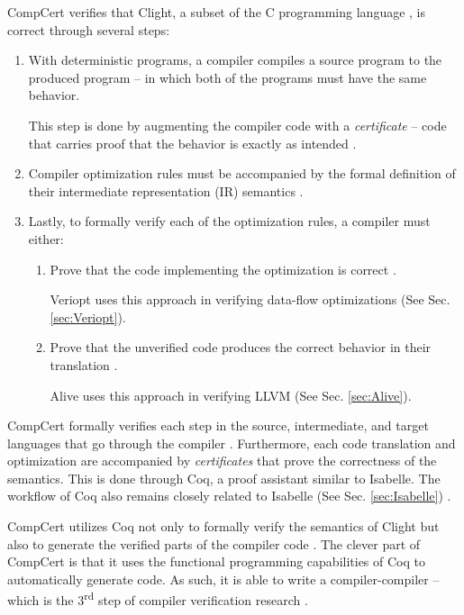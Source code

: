 CompCert verifies that Clight, a subset of the C programming language \cite{compcertVerification}, is correct through several steps:
\begin{enumerate}
    \item With deterministic programs, a compiler compiles a source program to the produced program -- in which both of the programs must have 
          the same behavior.
    
    This step is done by augmenting the compiler code with a \emph{certificate} -- code that carries proof that the behavior is exactly as intended 
    \cite[Sec. 2.2]{compcertVerification}.

    \item Compiler optimization rules must be accompanied by the formal definition of their intermediate representation (IR) semantics 
          \cite{compcertVerification,ATVA21_GraalVM_IR_Semantics}.
    
    \item Lastly, to formally verify each of the optimization rules, a compiler must either:
    \begin{enumerate}
        \item Prove that the code implementing the optimization is correct \cite[Sec. 2.4]{compcertVerification}.
        
        Veriopt uses this approach in verifying data-flow optimizations (See Sec. \ref{sec:Veriopt}).

        \item Prove that the unverified code produces the correct behavior in their translation \cite[Sec. 2.4]{compcertVerification}.

        Alive uses this approach in verifying LLVM (See Sec. \ref{sec:Alive}).
    \end{enumerate}
\end{enumerate}

CompCert formally verifies each step in the source, intermediate, and target languages that go through the compiler 
\cite[Sec. 3.3]{compcertVerification}. Furthermore, each code translation and optimization are accompanied by \emph{certificates} that prove 
the correctness of the semantics. This is done through Coq, a proof assistant similar to Isabelle. The workflow of Coq also remains closely related to 
Isabelle (See Sec. \ref{sec:Isabelle}) \cite[Sec. 3.3]{compcertVerification}. 

CompCert utilizes Coq not only to formally verify the semantics of Clight but also to generate the verified parts of the compiler code 
\cite[Sec. 3.4]{compcertVerification}. The clever part of CompCert is that it uses the functional programming capabilities of Coq 
to automatically generate code. As such, it is able to write a compiler-compiler -- which is the 3\textsuperscript{rd} step of compiler verification research 
\cite{CompilerOptimization}.

